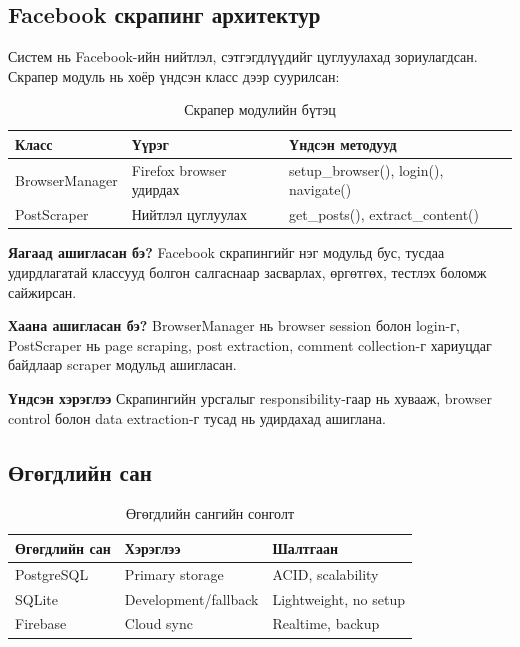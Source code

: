 \documentclass[12pt,a4paper]{report}
\begin{document}
\subsection{Facebook скрапинг архитектур}

Систем нь Facebook-ийн нийтлэл, сэтгэгдлүүдийг цуглуулахад зориулагдсан. Скрапер модуль нь хоёр үндсэн класс дээр суурилсан:

\begin{table}[H]
\centering
\caption{Скрапер модулийн бүтэц}
\begin{tabular}{|l|l|l|}
\hline
\textbf{Класс} & \textbf{Үүрэг} & \textbf{Үндсэн методууд} \\
\hline
BrowserManager & Firefox browser удирдах & setup\_browser(), login(), navigate() \\
PostScraper & Нийтлэл цуглуулах & get\_posts(), extract\_content() \\
\hline
\end{tabular}
\end{table}


\textbf{Яагаад ашигласан бэ?} Facebook скрапингийг нэг модульд бус, тусдаа удирдлагатай классууд болгон салгаснаар засварлах, өргөтгөх, тестлэх боломж сайжирсан.

\textbf{Хаана ашигласан бэ?} BrowserManager нь browser session болон login-г, PostScraper нь page scraping, post extraction, comment collection-г хариуцдаг байдлаар scraper модульд ашигласан.

\textbf{Үндсэн хэрэглээ} Скрапингийн урсгалыг responsibility-гаар нь хувааж, browser control болон data extraction-г тусад нь удирдахад ашиглана.

\subsection{Өгөгдлийн сан}

\begin{table}[H]
\centering
\caption{Өгөгдлийн сангийн сонголт}
\begin{tabular}{|l|l|l|}
\hline
\textbf{Өгөгдлийн сан} & \textbf{Хэрэглээ} & \textbf{Шалтгаан} \\
\hline
PostgreSQL & Primary storage & ACID, scalability \\
SQLite & Development/fallback & Lightweight, no setup \\
Firebase & Cloud sync & Realtime, backup \\
\hline
\end{tabular}
\end{table}
\end{document}
